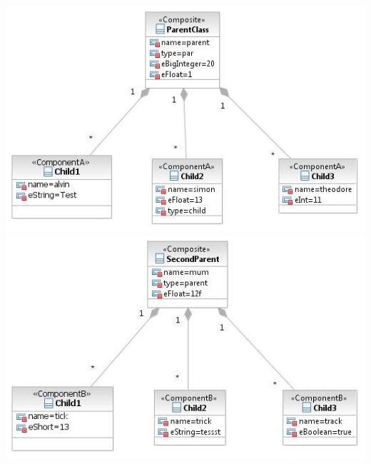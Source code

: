 \documentclass[a4paper]{article}
\begin{document}
\begin{description}
	\includegraphics[scale=0.5]{CompareChildrenMatchedOrSimilarTestScreens/Testcase09model1.jpeg}
	\includegraphics[scale=0.5]{CompareChildrenMatchedOrSimilarTestScreens/Testcase09model2.jpeg}
	\end{description}
	
	
\end{document}

